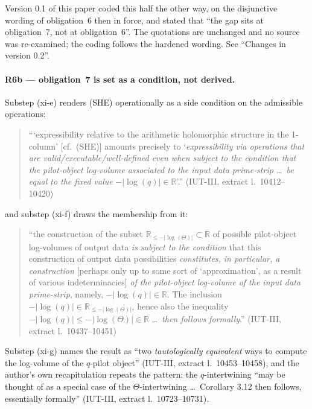\documentclass[11pt,a4paper]{article}
\theoremstyle{definition}
\newcommand{\anchor}[2]{(#1, extract l.~#2)}
\begin{document}
\medskip\noindent
Version 0.1 of this paper coded this half the other way, on the disjunctive
wording of obligation~6 then in force, and stated that ``the gap sits at
obligation~7, not at obligation~6''. The quotations are unchanged and no source
was re-examined; the coding follows the hardened wording. See ``Changes in
version 0.2''.

\paragraph{R6b --- obligation~7 is set as a condition, not derived.} Substep (xi-e)
renders (SHE) operationally as a side condition on the admissible operations:

\begin{quote}\small
```expressibility relative to the arithmetic holomorphic structure in the
1-column' [cf.\ (SHE)] amounts precisely to `\emph{expressibility via operations
that are valid/executable/well-defined even when subject to the condition that
the pilot-object log-volume associated to the input data prime-strip \dots\ be
equal to the fixed value} $-|\log(q)| \in \mathbb{R}$'.''
\hfill\anchor{IUT-III}{10412--10420}
\end{quote}

and substep (xi-f) draws the membership from it:

\begin{quote}\small
``the construction of the subset $\mathbb{R}_{\le -|\log(\Theta)|} \subset
\mathbb{R}$ of possible pilot-object log-volumes of output data \emph{is subject
to the condition} that this construction of output data possibilities
\emph{constitutes, in particular, a construction} [perhaps only up to some sort of
`approximation', as a result of various indeterminacies] \emph{of the
pilot-object log-volume of the input data prime-strip}, namely,
$-|\log(q)| \in \mathbb{R}$. The inclusion
$-|\log(q)| \in \mathbb{R}_{\le -|\log(\Theta)|}$, hence also the inequality
$-|\log(q)| \le -|\log(\Theta)| \in \mathbb{R}$ \dots\ \emph{then follows
formally}.'' \hfill\anchor{IUT-III}{10437--10451}
\end{quote}

Substep (xi-g) names the result as ``two \emph{tautologically equivalent} ways to
compute the log-volume of the $q$-pilot object'' \anchor{IUT-III}{10453--10458},
and the author's own recapitulation repeats the pattern: the $q$-intertwining
``may be thought of as a special case of the $\Theta$-intertwining \dots\
Corollary 3.12 then follows, essentially formally''
\anchor{IUT-III}{10723--10731}.
\end{document}
